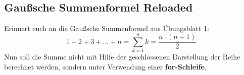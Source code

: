 \subsection{Gaußsche Summenformel Reloaded }
Erinnert euch an die Gaußsche Summenformel aus Übungsblatt 1:
$$1+2+3+\ldots+n = \sum_{k=1}^nk=\frac{n\cdot(n+1)}{2}$$
Nun soll die Summe nicht mit Hilfe der geschlossenen Darstellung der Reihe berechnet werden, sondern unter Verwendung einer \textbf{for-Schleife}.

